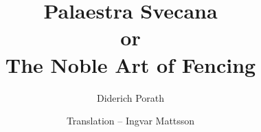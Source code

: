 \documentclass[a4paper]{book}
\begin{document}
\title{Palaestra Svecana \\ or \\ \Large{The Noble Art of Fencing} }
\author{Diderich Porath}
\author{Translation -- Ingvar Mattsson}

\maketitle




\end{document}
